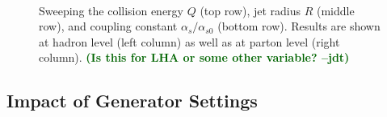 \documentclass[11pt]{cernrep}
\newcommand{\jdt}[1]{\textbf{\textcolor{darkgreen}{(#1 --jdt)}}}
\begin{document}
\begin{figure}
{\label{fig:sweep_as_hadron}
}
$\quad$
\caption{Sweeping the collision energy $Q$ (top row), jet radius $R$ (middle row), and coupling constant $\alpha_s/\alpha_{s0}$ (bottom row).  Results are shown at hadron level (left column) as well as at parton level (right column).  \jdt{Is this for LHA or some other variable?}}
\label{fig:ee_sweep}
\end{figure}

\subsection{Impact of Generator Settings}
\label{quarkgluon_sec:ee_settings}
\end{document}
